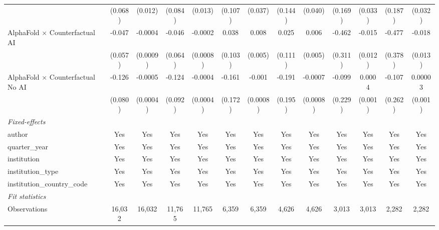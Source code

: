 \begin{tabular}{lcccccccccccc}
                                            & (0.068)      & (0.012)  & (0.084)      & (0.013)  & (0.107)      & (0.037)  & (0.144)     & (0.040)  & (0.169) & (0.033) & (0.187) & (0.032)\\   
   AlphaFold $\times$ Counterfactual AI     & -0.047       & -0.0004  & -0.046       & -0.0002  & 0.038        & 0.008    & 0.025       & 0.006    & -0.462  & -0.015  & -0.477  & -0.018\\   
                                            & (0.057)      & (0.0009) & (0.064)      & (0.0008) & (0.103)      & (0.005)  & (0.111)     & (0.005)  & (0.311) & (0.012) & (0.378) & (0.013)\\   
   AlphaFold $\times$ Counterfactual No AI  & -0.126       & -0.0005  & -0.124       & -0.0004  & -0.161       & -0.001   & -0.191      & -0.0007  & -0.099  & 0.0004  & -0.107  & 0.00003\\   
                                            & (0.080)      & (0.0004) & (0.092)      & (0.0004) & (0.172)      & (0.0008) & (0.195)     & (0.0008) & (0.229) & (0.001) & (0.262) & (0.001)\\   
   \midrule
   \emph{Fixed-effects}\\
   author                                   & Yes          & Yes      & Yes          & Yes      & Yes          & Yes      & Yes         & Yes      & Yes     & Yes     & Yes     & Yes\\  
   quarter\_year                            & Yes          & Yes      & Yes          & Yes      & Yes          & Yes      & Yes         & Yes      & Yes     & Yes     & Yes     & Yes\\  
   institution                              & Yes          & Yes      & Yes          & Yes      & Yes          & Yes      & Yes         & Yes      & Yes     & Yes     & Yes     & Yes\\  
   institution\_type                        & Yes          & Yes      & Yes          & Yes      & Yes          & Yes      & Yes         & Yes      & Yes     & Yes     & Yes     & Yes\\  
   institution\_country\_code               & Yes          & Yes      & Yes          & Yes      & Yes          & Yes      & Yes         & Yes      & Yes     & Yes     & Yes     & Yes\\  
   \midrule
   \emph{Fit statistics}\\
   Observations                             & 16,032       & 16,032   & 11,765       & 11,765   & 6,359        & 6,359    & 4,626       & 4,626    & 3,013   & 3,013   & 2,282   & 2,282\\  

\end{tabular}
